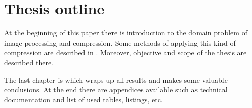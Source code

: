 \section{Thesis outline}

At the beginning of this paper there is introduction to the domain problem of image processing and compression.
Some methods of applying this kind of compression are described in . Moreover, objective and scope
of the thesis are described there. 


The last chapter is  which wraps up all results and makes some valuable conclusions.
At the end there are appendices available such as technical documentation and list of used tables, listings, etc.
